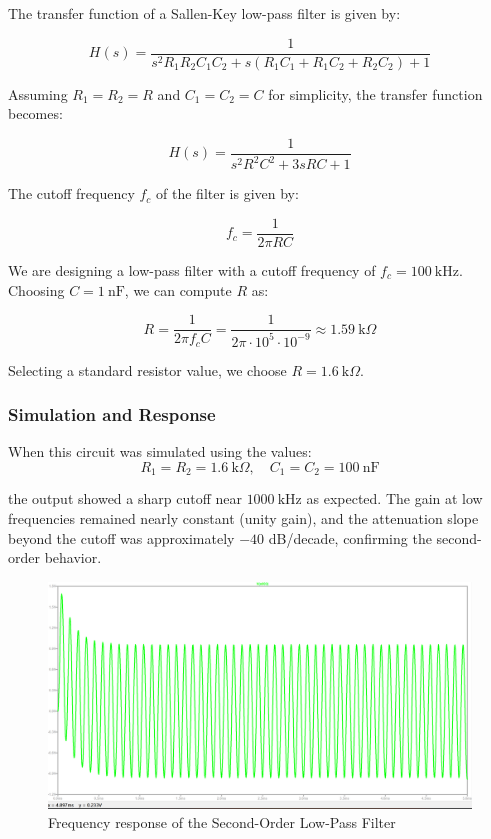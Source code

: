 The transfer function of a Sallen-Key low-pass filter is given by:

\[
H(s) = \frac{1}{s^2 R_1 R_2 C_1 C_2 + s(R_1 C_1 + R_1 C_2 + R_2 C_2) + 1}
\]

Assuming $R_1 = R_2 = R$ and $C_1 = C_2 = C$ for simplicity, the transfer function becomes:

\[
H(s) = \frac{1}{s^2 R^2 C^2 + 3sRC + 1}
\]

The cutoff frequency $f_c$ of the filter is given by:

\[
f_c = \frac{1}{2\pi RC}
\]

We are designing a low-pass filter with a cutoff frequency of $f_c = 100~\text{kHz}$. Choosing $C = 1~\text{nF}$, we can compute $R$ as:

\[
R = \frac{1}{2\pi f_c C} = \frac{1}{2\pi \cdot 10^5 \cdot 10^{-9}} \approx 1.59~\text{k}\Omega
\]

Selecting a standard resistor value, we choose $R = 1.6~\text{k}\Omega$.

\subsubsection*{Simulation and Response}

When this circuit was simulated using the values:
\[
R_1 = R_2 = 1.6~\text{k}\Omega, \quad C_1 = C_2 = 100~\text{nF}
\]

the output showed a sharp cutoff near $1000~\text{kHz}$ as expected. The gain at low frequencies remained nearly constant (unity gain), and the attenuation slope beyond the cutoff was approximately $-40$ dB/decade, confirming the second-order behavior.

\begin{figure}[H]
    \centering
    \includegraphics[width=1\linewidth]{sec/low-pass/asd.png}
    \caption{Frequency response of the Second-Order Low-Pass Filter}
    \label{fig:low-pass-response}
\end{figure}

